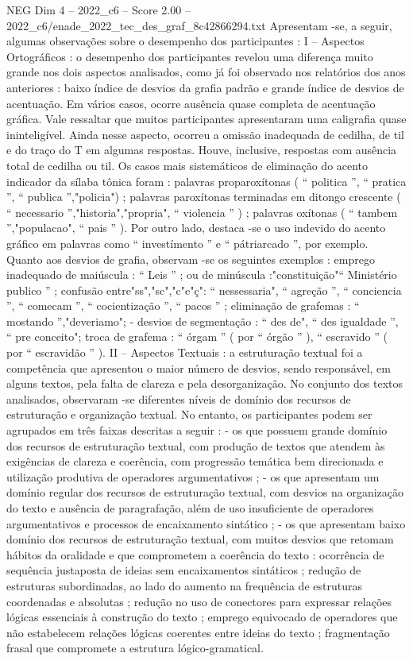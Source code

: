 \begin{textsample}{NEG Dim 4 – 2022\_c6 – Score 2.00 – 2022\_c6/enade\_2022\_tec\_des\_graf\_8c42866294.txt}
Apresentam -se, a seguir, algumas observações sobre o desempenho dos participantes : I – Aspectos Ortográficos : o desempenho dos participantes revelou uma diferença muito grande nos dois aspectos analisados, como já foi observado nos relatórios dos anos anteriores : baixo índice de desvios da grafia padrão e grande índice de desvios de acentuação.
Em vários casos, ocorre ausência quase completa de acentuação gráfica.
Vale ressaltar que muitos participantes apresentaram uma caligrafia quase ininteligível.
Ainda nesse aspecto, ocorreu a omissão inadequada de cedilha, de til e do traço do T em algumas respostas.
Houve, inclusive, respostas com ausência total de cedilha ou til.
Os casos mais sistemáticos de eliminação do acento indicador da sílaba tônica foram : palavras proparoxítonas ( “ politica ”, “ pratica ”, “ publica ”,"policia") ; palavras paroxítonas terminadas em ditongo crescente ( “ necessario ”,"historia","propria", “ violencia ” ) ; palavras oxítonas ( “ tambem ”,"populacao", “ pais ” ).
Por outro lado, destaca -se o uso indevido do acento gráfico em palavras como “ investímento ” e “ pátriarcado ”, por exemplo.
Quanto aos desvios de grafia, observam -se os seguintes exemplos : emprego inadequado de maiúscula : “ Leis ” ; ou de minúscula :"constituição"“ Ministério publico ” ; confusão entre"ss","sc","c"e"ç": “ nessessaria", “ agreção ”, “ conciencia ”, “ comecam ”, “ cocientização ”, “ pacos ” ; eliminação de grafemas : “ mostando ”,"deveriamo"; - desvios de segmentação : “ des de", “ des igualdade ”, “ pre conceito"; troca de grafema : “ órgam ” ( por “ órgão ” ), “ escravido ” ( por “ escravidão ” ).
II – Aspectos Textuais : a estruturação textual foi a competência que apresentou o maior número de desvios, sendo responsável, em alguns textos, pela falta de clareza e pela desorganização.
No conjunto dos textos analisados, observaram -se diferentes níveis de domínio dos recursos de estruturação e organização textual.
No entanto, os participantes podem ser agrupados em três faixas descritas a seguir : - os que possuem grande domínio dos recursos de estruturação textual, com produção de textos que atendem às exigências de clareza e coerência, com progressão temática bem direcionada e utilização produtiva de operadores argumentativos ; - os que apresentam um domínio regular dos recursos de estruturação textual, com desvios na organização do texto e ausência de paragrafação, além de uso insuficiente de operadores argumentativos e processos de encaixamento sintático ; - os que apresentam baixo domínio dos recursos de estruturação textual, com muitos desvios que retomam hábitos da oralidade e que comprometem a coerência do texto : ocorrência de sequência justaposta de ideias sem encaixamentos sintáticos ; redução de estruturas subordinadas, ao lado do aumento na frequência de estruturas coordenadas e absolutas ; redução no uso de conectores para expressar relações lógicas essenciais à construção do texto ; emprego equivocado de operadores que não estabelecem relações lógicas coerentes entre ideias do texto ; fragmentação frasal que compromete a estrutura lógico-gramatical.

\end{textsample}
